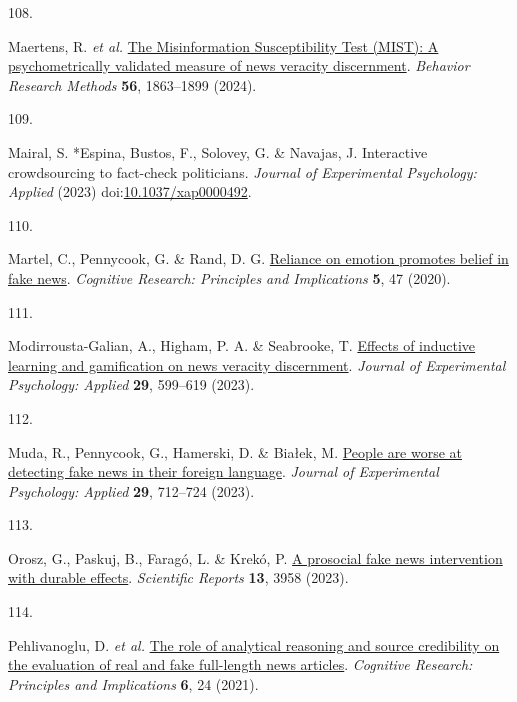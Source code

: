 \documentclass[
  man]{apa6}
\newlength{\cslhangindent}
\newlength{\csllabelwidth}
\newenvironment{CSLReferences}[2] %
 {\begin{list}{}{%
  \setlength{\itemindent}{0pt}
  \setlength{\leftmargin}{0pt}
  \setlength{\parsep}{0pt}
  \ifodd #1
   \setlength{\leftmargin}{\cslhangindent}
   \setlength{\itemindent}{-1\cslhangindent}
  \fi
  \setlength{\itemsep}{#2\baselineskip}}}
 {\end{list}}
\newcommand{\CSLLeftMargin}[1]{\parbox[t]{\csllabelwidth}{\strut#1\strut}}
\newcommand{\CSLRightInline}[1]{\parbox[t]{\linewidth - \csllabelwidth}{\strut#1\strut}}
\begin{document}
\begin{CSLReferences}{0}{0}
\CSLLeftMargin{108. }%
\CSLRightInline{*Maertens, R. \emph{et al.} \href{https://doi.org/10.3758/s13428-023-02124-2}{The Misinformation Susceptibility Test (MIST): A psychometrically validated measure of news veracity discernment}. \emph{Behavior Research Methods} \textbf{56}, 1863--1899 (2024).}

\CSLLeftMargin{109. }%
\CSLRightInline{Mairal, S. *Espina, Bustos, F., Solovey, G. \& Navajas, J. Interactive crowdsourcing to fact-check politicians. \emph{Journal of Experimental Psychology: Applied} (2023) doi:\href{https://doi.org/10.1037/xap0000492}{10.1037/xap0000492}.}

\CSLLeftMargin{110. }%
\CSLRightInline{*Martel, C., Pennycook, G. \& Rand, D. G. \href{https://doi.org/10.1186/s41235-020-00252-3}{Reliance on emotion promotes belief in fake news}. \emph{Cognitive Research: Principles and Implications} \textbf{5}, 47 (2020).}

\CSLLeftMargin{111. }%
\CSLRightInline{*Modirrousta-Galian, A., Higham, P. A. \& Seabrooke, T. \href{https://doi.org/10.1037/xap0000458}{Effects of inductive learning and gamification on news veracity discernment}. \emph{Journal of Experimental Psychology: Applied} \textbf{29}, 599--619 (2023).}

\CSLLeftMargin{112. }%
\CSLRightInline{*Muda, R., Pennycook, G., Hamerski, D. \& Białek, M. \href{https://doi.org/10.1037/xap0000475}{People are worse at detecting fake news in their foreign language}. \emph{Journal of Experimental Psychology: Applied} \textbf{29}, 712--724 (2023).}

\CSLLeftMargin{113. }%
\CSLRightInline{*Orosz, G., Paskuj, B., Faragó, L. \& Krekó, P. \href{https://doi.org/10.1038/s41598-023-30867-7}{A prosocial fake news intervention with durable effects}. \emph{Scientific Reports} \textbf{13}, 3958 (2023).}

\CSLLeftMargin{114. }%
\CSLRightInline{*Pehlivanoglu, D. \emph{et al.} \href{https://doi.org/10.1186/s41235-021-00292-3}{The role of analytical reasoning and source credibility on the evaluation of real and fake full-length news articles}. \emph{Cognitive Research: Principles and Implications} \textbf{6}, 24 (2021).}


\end{CSLReferences}
\end{document}
